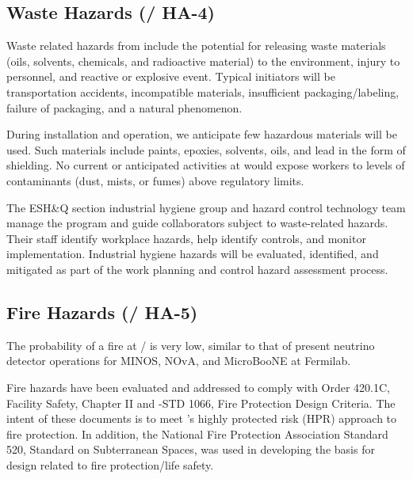 \subsection{Waste Hazards (/ HA-4)}

Waste related hazards from  include the potential for releasing
waste materials (oils, solvents, chemicals, and radioactive material)
to the environment, injury to personnel, and reactive or
explosive event. Typical initiators will be transportation accidents,
incompatible materials, insufficient packaging/labeling, failure of
packaging, and a natural phenomenon.

During installation and  operation, we anticipate 
few hazardous materials will be used. Such materials
include paints, epoxies, solvents, oils, and lead in the form of
shielding. No current or anticipated activities at  
would expose workers to levels of contaminants (dust, mists, or fumes)
above regulatory limits.

The ESH\&Q section industrial hygiene group and hazard control
technology team manage the program and guide 
collaborators subject to
waste-related hazards.  Their staff identify workplace
hazards, help identify controls, and monitor
implementation. Industrial hygiene hazards will be evaluated,
identified, and mitigated as part of the work planning and control
hazard assessment process.

\subsection{Fire Hazards (/ HA-5)}

The probability of a fire at / is very low,
similar to that of present neutrino detector operations for MINOS,
NOvA, and MicroBooNE at Fermilab.


Fire hazards have been evaluated and addressed to comply with 
Order 420.1C, Facility Safety, Chapter II and -STD 1066, Fire
Protection Design Criteria.  The intent of these documents is to meet
's highly protected risk (HPR) approach to fire protection.  In
addition, the National Fire Protection Association Standard
520, Standard on Subterranean Spaces, was used in developing the
basis for design related to fire protection/life safety.

